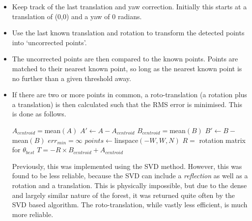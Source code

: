 \documentclass[12pt,oneside,a4paper,draft]{book}
\begin{document}
\begin{itemize}
\item Keep track of the last translation and yaw correction. Initially
  this starts at a translation of (0,0) and a yaw of 0 radians.
\item Use the last known translation and rotation to transform the
  detected points into `uncorrected points'.
\item The uncorrected points are then compared to the known
  points. Points are matched to their nearest known point, so long as
  the nearest known point is no further than a given threshold away.
\item If there are two or more points in common, a roto-translation (a
  rotation plus a translation) is then calculated such that the RMS
  error is minimised. This is done as follows.

  \IncMargin{1em}
  \begin{algorithm}
    \BlankLine
    $A_{centroid} = $mean$(A)$\;
    $A' \leftarrow A - A_{centroid}$\;
    $B_{centroid} = $mean$(B)$\;
    $B' \leftarrow B - $mean$(B)$\;
    \BlankLine
    $err_{min} = \infty$ \;
    $points \leftarrow $linspace$(-W, W, N)$ \;
    \BlankLine
    \BlankLine
    $R = $ rotation matrix for $\theta_{best}$ \;
    $T = -R \times B_{centroid} + A_{centroid}$\;
    \BlankLine
  \end{algorithm}
 
  Previously, this was implemented using the \gls{SVD}
  method. However, this was found to be less reliable,
  because the SVD can include a \emph{reflection} as well as a
  rotation and a translation. This is physically impossible, but due
  to the dense and largely similar nature of the forest, it was
  returned quite often by the SVD based algorithm. The
  roto-translation, while vastly less efficient, is much more reliable.



\end{itemize}
\end{document}
